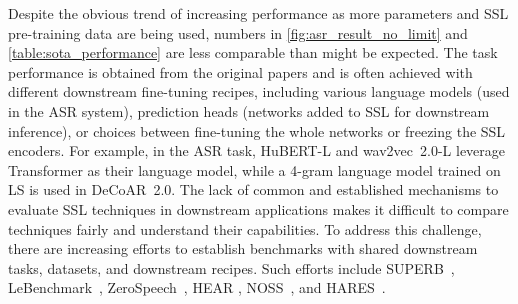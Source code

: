 Despite the obvious trend of increasing performance as more parameters and SSL
pre-training data are being used, numbers in \cref{fig:asr_result_no_limit} 
and \cref{table:sota_performance} are less comparable than might be expected.
The task performance is obtained from the original papers and is often
achieved with different downstream fine-tuning recipes, including various
language models (used in the ASR system), prediction heads (networks added to
SSL for downstream inference), or choices between fine-tuning the whole
networks or freezing the SSL encoders. For example, in the ASR task, HuBERT-L
and wav2vec~2.0-L leverage Transformer as their language model, while a 4-gram
language model trained on LS is used in DeCoAR~2.0. The lack of common and
established mechanisms to evaluate SSL techniques in downstream applications
makes it difficult to compare techniques fairly and understand their
capabilities. To address this challenge, there are increasing efforts to establish
benchmarks with shared downstream tasks, datasets, and downstream recipes. Such
efforts include SUPERB~\cite{yang_superb_2021}, 
LeBenchmark~\cite{evain21_interspeech}, ZeroSpeech~\cite{dunbar2020zero},
HEAR \cite{pmlr-v176-turian22a},
NOSS~\cite{shor20_interspeech}, and HARES~\cite{wang2021towards}. 

